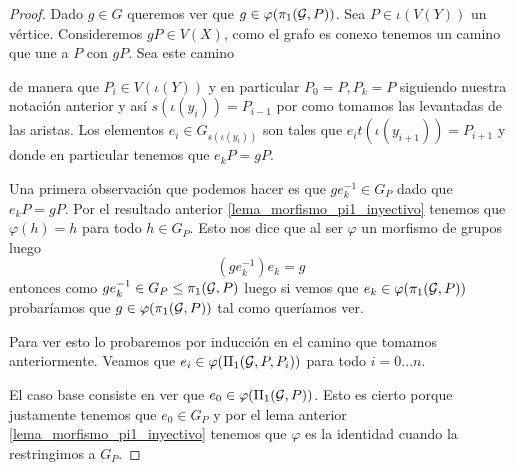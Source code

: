 \documentclass[tesis.tex]{subfiles}
\newcommand{\cG}{ {\cal G} }
\begin{document}
\begin{proof}
	Dado $g \in G$ queremos ver que $g \in \varphi(\pi_1(\cG, P))$.
	Sea $P \in \iota(V(Y))$ un vértice.
	Consideremos $gP \in V(X)$, como el grafo es conexo tenemos un camino que une a $P$ con $gP$. 
	Sea este camino 
	
	\begin{center}
	\end{center}
	


	de manera que $P_i \in V(\iota (Y))$ y en particular $P_0 = P, P_k = P$ siguiendo nuestra notación anterior y así $s(\iota (y_i)) = P_{i-1}$ por como tomamos las levantadas de las aristas.
	Los elementos $e_i \in G_{s(\iota (y_i))}$ son tales que $e_i t(\iota (y_{i+1})) = P_{i+1}$ y donde en particular tenemos que $e_k P = g P$.
	
	Una primera observación que podemos hacer es que $g e_k^{-1} \in G_P$ dado que  $e_k P = g P$.
	Por el resultado anterior \ref{lema_morfismo_pi1_inyectivo} tenemos que $\varphi(h) = h $ para todo $h \in G_P$.
	Esto nos dice que al ser $\varphi$ un morfismo de grupos luego 
	\[
	(ge_k^{-1}) e_k = g
	\]
	entonces como $ge_k^{-1} \in G_P \le \pi_1(\cG, P)$ luego si vemos que $e_k \in \varphi(\pi_1(\cG, P))$ probaríamos que $g \in \varphi (\pi_1(\cG,P))$ tal como queríamos ver.
		
	Para ver esto lo probaremos por inducción en el camino que tomamos anteriormente.
	Veamos que $e_i \in \varphi(\Pi_1(\cG, P, P_i))$ para todo $i = 0 \dots n$.
	
	El caso base consiste en ver que $e_0 \in \varphi(\Pi_1(\cG, P))$.
	Esto es cierto porque justamente tenemos que $e_0 \in G_P$ y por el lema anterior \ref{lema_morfismo_pi1_inyectivo} tenemos que $\varphi$ es la identidad cuando la restringimos a $G_P$.
	

\end{proof}
\end{document}
